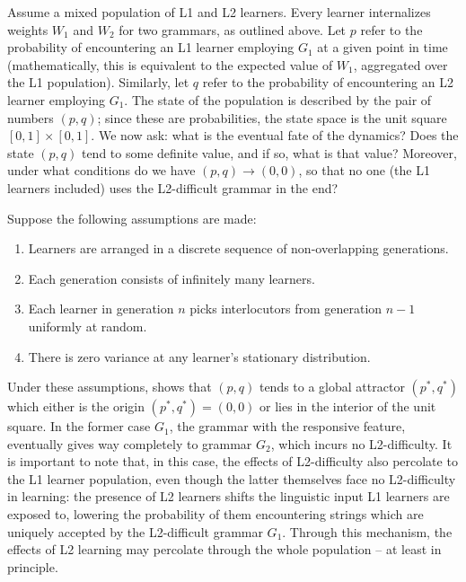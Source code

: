 Assume a mixed population of L1 and L2 learners. Every learner
internalizes weights \(W_1\) and \(W_2\) for two grammars, as outlined
above. Let \(p\) refer to the probability of encountering an L1 learner
employing \(G_1\) at a given point in time (mathematically, this is
equivalent to the expected value of \(W_1\), aggregated over the L1
population). Similarly, let \(q\) refer to the probability of
encountering an L2 learner employing \(G_1\). The state of the
population is described by the pair of numbers \((p,q)\); since these
are probabilities, the state space is the unit square
\([0,1] \times [0,1]\). We now ask: what is the eventual fate of the
dynamics? Does the state \((p,q)\) tend to some definite value, and if
so, what is that value? Moreover, under what conditions do we have
\((p,q) \to (0,0)\), so that no one (the L1 learners included) uses the
L2-difficult grammar in the end?

Suppose the following assumptions are made:

\begin{enumerate}
\def\labelenumi{\arabic{enumi}.}
\tightlist
\item
  Learners are arranged in a discrete sequence of non-overlapping
  generations.
\item
  Each generation consists of infinitely many learners.
\item
  Each learner in generation \(n\) picks interlocutors from generation
  \(n-1\) uniformly at random.
\item
  There is zero variance at any learner's stationary distribution.
\end{enumerate}

\noindent Under these assumptions, \textcite{Kauhanen2022} shows that
\((p,q)\) tends to a global attractor \((p^*, q^*)\) which either is the
origin \((p^*, q^*) = (0,0)\) or lies in the interior of the unit
square. In the former case \(G_1\), the grammar with the responsive
feature, eventually gives way completely to grammar \(G_2\), which
incurs no L2-difficulty. It is important to note that, in this case, the
effects of L2-difficulty also percolate to the L1 learner population,
even though the latter themselves face no L2-difficulty in learning: the
presence of L2 learners shifts the linguistic input L1 learners are
exposed to, lowering the probability of them encountering strings which
are uniquely accepted by the L2-difficult grammar \(G_1\). Through this
mechanism, the effects of L2 learning may percolate through the whole
population -- at least in principle.

